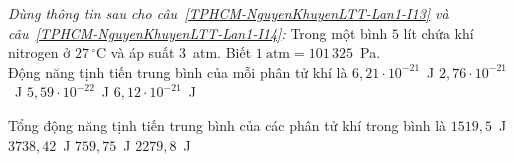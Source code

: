 	\begin{ex}%
		\label{TPHCM-NguyenKhuyenLTT-Lan1-I13}\textit{Dùng thông tin sau cho câu~\ref{TPHCM-NguyenKhuyenLTT-Lan1-I13} và câu~\ref{TPHCM-NguyenKhuyenLTT-Lan1-I14}:} Trong một bình $5$ lít chứa khí nitrogen ở $27\,^\circ\text{C}$ và áp suất $3$~atm. Biết $1~\text{atm}=101\,325$~Pa.\\
		Động năng tịnh tiến trung bình của mỗi phân tử khí là
		\choice
		{\True $6{,}21\cdot 10^{-21}$~J}
		{$2{,}76\cdot 10^{-21}$~J}
		{$5{,}59\cdot 10^{-22}$~J}
		{$6{,}12\cdot 10^{-21}$~J}
	\end{ex}

	\begin{ex}%
		\label{TPHCM-NguyenKhuyenLTT-Lan1-I14}Tổng động năng tịnh tiến trung bình của các phân tử khí trong bình là
		\choice
		{$1519{,}5$~J}
		{$3738{,}42$~J}
		{$759{,}75$~J}
		{\True $2279{,}8$~J}
	\end{ex}


